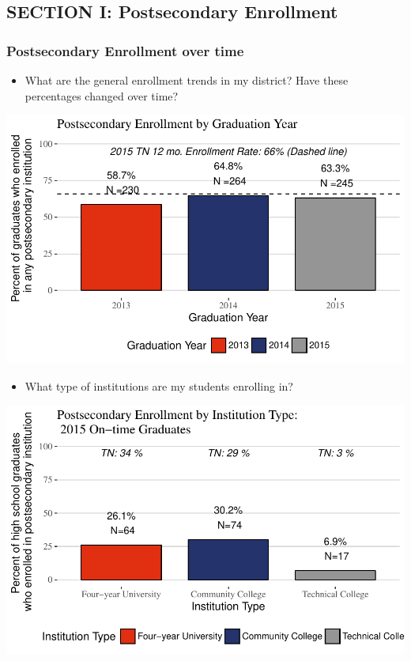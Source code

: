\documentclass[11pt,]{article}
\providecommand{\tightlist}{%
  \setlength{\itemsep}{0pt}\setlength{\parskip}{0pt}}
\begin{document}
\newpage

\subsection{SECTION I: Postsecondary
Enrollment}\label{section-i-postsecondary-enrollment}

\subsubsection{Postsecondary Enrollment over
time}\label{postsecondary-enrollment-over-time}

\begin{itemize}
\tightlist
\item
  What are the general enrollment trends in my district? Have these
  percentages changed over time?
\end{itemize}

\begin{center}\includegraphics{20170424_PSWRR_files/figure-latex/Enrollment over time-1} \end{center}

\begin{itemize}
\tightlist
\item
  What type of institutions are my students enrolling in?
\end{itemize}

\begin{center}\includegraphics{20170424_PSWRR_files/figure-latex/District by Type-1} \end{center}
\end{document}
